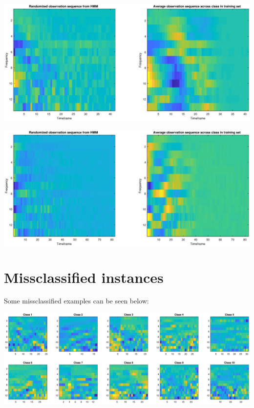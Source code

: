 \documentclass[]{article}
\let\origfigure\figure
\let\endorigfigure\endfigure
\renewenvironment{figure}[1][2] {
    \expandafter\origfigure\expandafter[H]
} {
    \endorigfigure
}
\begin{document}
\begin{figure}
\centering
\includegraphics{../Results/randCompClass8.eps}
\caption{Randomized vs training data class eight}
\end{figure}

\begin{figure}
\centering
\includegraphics{../Results/randCompClass9.eps}
\caption{Randomized vs training data class nine}
\end{figure}

\newpage

\hypertarget{missclassified-instances}{%
\section{Missclassified instances}\label{missclassified-instances}}

Some missclassified examples can be seen below:

\begin{figure}
\centering
\includegraphics{../Results/missclassifiedInstances.eps}
\caption{Example missclassified instances}
\end{figure}
\end{document}

